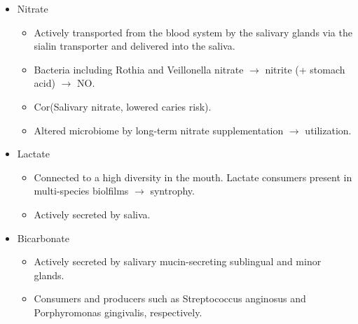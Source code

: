 \begin{tcolorbox}[breakable,
    title=Saliva,
    title filled=false,
    colback=blue!5!white,
    colframe=blue!75!black]
\begin{itemize}
\begin{itemize}
            \item Proteins as main fuel source by proteolytic degradation of salivary proteins. 
            \item The Arginine Deiminase System (ADS) hydrolyses arginine to create citrulline and ammonia; the ammonia 
            is beneficial to the host by neutralizing lactic acid in carious lesions. This pathway has become prominent 
            as some dental products now contain arginine as an additive. 
            \item CH linked to proteins (glycoproteins) can also be used by sialidases action and other glycosidases 
            (glycolytic EMP pathway = glucose $\rightarrow$ pyruvate). Here importance of bacteria cooperation in biofilms as no 
            single bacterium contains all the necessary enzymes involved in the EMP pathway. 
        \end{itemize}
        \item Nitrate
        \begin{itemize}
            \item Actively transported from the blood system by the salivary glands via the sialin transporter and delivered into the saliva. 
            \item Bacteria including Rothia and Veillonella nitrate $\rightarrow$ nitrite (+ stomach acid) $\rightarrow$ NO. 
            \item Cor(Salivary nitrate, lowered caries risk).
            \item Altered microbiome by long-term nitrate supplementation $\rightarrow$ utilization.
        \end{itemize}
        \item Lactate
        \begin{itemize}
            \item Connected to a high diversity in the mouth. Lactate consumers present in multi-species biolfilms 
            $\rightarrow$ syntrophy. 
            \item Actively secreted by saliva.
        \end{itemize}
        \item Bicarbonate
        \begin{itemize}
            \item Actively secreted by salivary mucin-secreting sublingual and minor glands.
            \item Consumers and producers such as Streptococcus anginosus and Porphyromonas gingivalis, respectively.

\end{itemize}
\end{itemize}
\end{tcolorbox}

